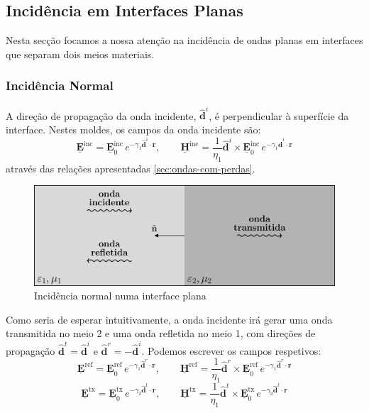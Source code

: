 \subsection{Incidência em Interfaces Planas}

Nesta secção focamos a nossa atenção na incidência de ondas planas em interfaces que separam dois meios materiais.

\subsubsection{Incidência Normal}

A direção de propagação da onda incidente, $\mathbf{\hat{d}}^i$, é perpendicular à superfície da interface. Nestes moldes, os campos da onda incidente são:
\begin{equation}
    \mathbf{\underline{E}}^{\text{inc}} = \mathbf{\underline{E}}^{\text{inc}}_{0}\, e^{-\gamma_1 \mathbf{\hat{d}}^i \cdot \mathbf{r}},
    \qquad
    \mathbf{\underline{H}}^{\text{inc}} = \frac{1}{\eta_1} \mathbf{\hat{d}}^i \times \mathbf{\underline{E}}^{\text{inc}}_{0}\, e^{-\gamma_1 \mathbf{\hat{d}}^i \cdot \mathbf{r}}
\end{equation}
através das relações apresentadas \ref{sec:ondas-com-perdas}.

\begin{figure}[H]
    \centering
    \includegraphics[width=0.5\linewidth]{img/1/Incidencia-normal.pdf}
    \caption{Incidência normal numa interface plana}
    \label{fig:Incidencia-normal}
\end{figure}

\vspace{-1em}
Como seria de esperar intuitivamente, a onda incidente irá gerar uma onda transmitida no meio 2 e uma onda refletida no meio 1, com direções de propagação $\mathbf{\hat{d}}^t = \mathbf{\hat{d}}^i$ e $\mathbf{\hat{d}}^r = -\mathbf{\hat{d}}^i$. Podemos escrever os campos respetivos:
\begin{equation}
    \mathbf{\underline{E}}^{\text{ref}} = \mathbf{\underline{E}}^{\text{ref}}_{0}\, e^{-\gamma_1 \mathbf{\hat{d}}^r \cdot \mathbf{r}},
    \qquad
    \mathbf{\underline{H}}^{\text{ref}} = \frac{1}{\eta_1} \mathbf{\hat{d}}^r \times \mathbf{\underline{E}}^{\text{ref}}_{0}\, e^{-\gamma_1 \mathbf{\hat{d}}^r \cdot \mathbf{r}}
\end{equation}
\begin{equation}
    \mathbf{\underline{E}}^{\text{tx}} = \mathbf{\underline{E}}^{\text{tx}}_{0}\, e^{-\gamma_2 \mathbf{\hat{d}}^t \cdot \mathbf{r}},
    \qquad
    \mathbf{\underline{H}}^{\text{tx}} = \frac{1}{\eta_1} \mathbf{\hat{d}}^t \times \mathbf{\underline{E}}^{\text{tx}}_{0}\, e^{-\gamma_2 \mathbf{\hat{d}}^t \cdot \mathbf{r}}
\end{equation}

